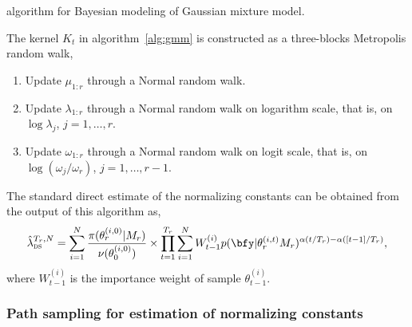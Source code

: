 \documentclass[11pt, fontset=Minion, showoverfull,
bib, mintcode, minted=cache]{marticle}
\begin{document}
\begin{algorithm}[t]
\caption{\smc algorithm for Bayesian modeling of Gaussian mixture
  model.}
\label{alg:gmm}
\end{algorithm}

The \mcmc kernel $K_t$ in algorithm~\ref{alg:gmm} is constructed as a
three-blocks Metropolis random walk,
\begin{enumerate}
  \item Update $\mu_{1:r}$ through a Normal random walk.
  \item Update $\lambda_{1:r}$ through a Normal random walk on logarithm
    scale, that is, on $\log\lambda_{j}$, $j = 1, \dots, r$.
  \item Update $\omega_{1:r}$ through a Normal random walk on logit scale,
    that is, on $\log(\omega_{j}/\omega_r)$, $j = 1,\dots,r-1$.
\end{enumerate}

The standard direct estimate of the normalizing constants
\textcite{DelMoral:2006hc} can be obtained from the output of this \smc
algorithm as,
\begin{equation}
  \hat\lambda_{\text{\textsc{ds}}}^{T_r,N} =
  \sum_{i=1}^N \frac{\pi(\theta_r^{(i,0)}|M_r)}{\nu(\theta_0^{(i,0)})} \times
  \prod_{t=1}^{T_r} \sum_{i=1}^N W_{t-1}^{(i)}
  p(\bfy|\theta_r^{(i,t)}M_r)^{\alpha(t/T_r) - \alpha([t-1]/T_r)},
  \label{eq:smc-ds}
\end{equation}
where $W_{t-1}^{(i)}$ is the importance weight of sample $\theta_{t-1}^{(i)}$.

\subsubsection{Path sampling for estimation of normalizing constants}
\end{document}
